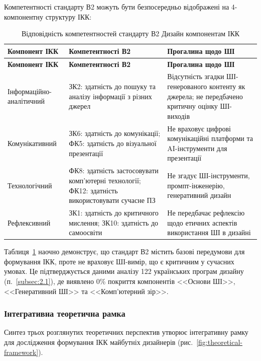 Компетентності стандарту В2 можуть бути безпосередньо відображені на 4-компонентну структуру ІКК:

\begin{longtable}{@{}p{}p{}p{}@{}}
\caption{Відповідність компетентностей стандарту В2 Дизайн компонентам ІКК}\label{tab:b2-ikk-mapping} \\
\hline
\textbf{Компонент ІКК} & \textbf{Компетентності В2} & \textbf{Прогалина щодо ШІ} \\
\hline
\endfirsthead
\hline
\textbf{Компонент ІКК} & \textbf{Компетентності В2} & \textbf{Прогалина щодо ШІ} \\
\hline
\endhead
Інформаційно-аналітичний & ЗК2: здатність до пошуку та аналізу інформації з різних джерел & Відсутність згадки ШІ-генерованого контенту як джерела; не передбачено критичну оцінку ШІ-виходів \\
\addlinespace
Комунікативний & ЗК6: здатність до комунікації; ФК5: здатність до візуальної презентації & Не враховує цифрові комунікаційні платформи та AI-інструменти для презентації \\
\addlinespace
Технологічний & ФК8: здатність застосовувати комп'ютерні технології; ФК12: здатність використовувати сучасне ПЗ & Не згадує ШІ-інструменти, промпт-інженерію, генеративний дизайн \\
\addlinespace
Рефлексивний & ЗК1: здатність до критичного мислення; ЗК10: здатність до самоосвіти & Не передбачає рефлексію щодо етичних аспектів використання ШІ в дизайні \\
\hline
\end{longtable}

Таблиця~\ref{tab:b2-ikk-mapping} наочно демонструє, що стандарт В2 містить базові передумови для формування ІКК, проте не враховує ШІ-вимір, що є критичним у сучасних умовах. Це підтверджується даними аналізу 122 українських програм дизайну (п.~\ref{subsec:2.1}), де виявлено 0\% покриття компонентів <<Основи ШІ>>, <<Генеративний ШІ>> та <<Комп'ютерний зір>>.

\subsubsection{Інтегративна теоретична рамка}\label{sssec:1.4.4}

Синтез трьох розглянутих теоретичних перспектив утворює інтегративну рамку для дослідження формування ІКК майбутніх дизайнерів (рис.~\ref{fig:theoretical-framework}).


